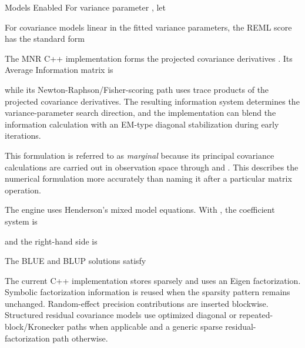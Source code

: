 \documentclass[a4paper]{book}
\begin{document}
\begin{Section}{Models Enabled}
For variance parameter , let


For covariance models linear in the fitted variance parameters, the REML score
has the standard form


The MNR C++ implementation forms the projected covariance derivatives
. Its Average Information matrix is


while its Newton-Raphson/Fisher-scoring path uses trace products of the
projected covariance derivatives. The resulting information system determines
the variance-parameter search direction, and the implementation can blend the
information calculation with an EM-type diagonal stabilization during early
iterations.

This formulation is referred to as \emph{marginal} because its principal
covariance calculations are carried out in observation space through 
and . This describes the numerical formulation more accurately than
naming it after a particular matrix operation.


The  engine uses Henderson's mixed model equations. With
, the coefficient system is


and the right-hand side is


The BLUE and BLUP solutions satisfy


The current C++ implementation stores  sparsely and uses an Eigen
 factorization. Symbolic factorization information is
reused when the sparsity pattern remains unchanged. Random-effect precision
contributions are inserted blockwise. Structured residual covariance models
use optimized diagonal or repeated-block/Kronecker paths when applicable and a
generic sparse residual-factorization path otherwise.


\end{Section}
\end{document}
